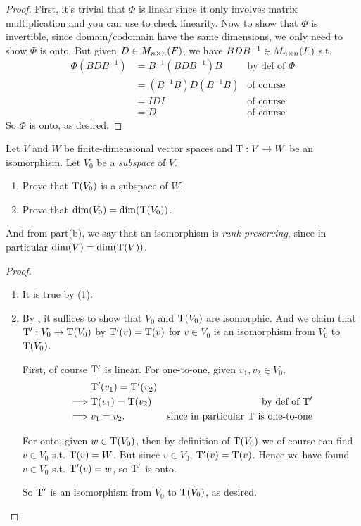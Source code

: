 \begin{proof}
First, it's trivial that \(\Phi\) is linear since it only involves matrix multiplication and you can use  to check linearity.
Now to show that \(\Phi\) is invertible, since domain/codomain have the same dimensions, we only need to show \(\Phi\) is onto.
But given \(D \in M_{n \times n}(F)\), we have \(B D B^{-1} \in M_{n \times n}(F)\) s.t.
\begin{align*}
    \Phi(B D B^{-1}) & = B^{-1} (B D B^{-1}) B & \text{by def of \(\Phi\)} \\
                     & = (B^{-1}B) D (B^{-1} B) & \text{of course} \\
                     & = IDI & \text{of course} \\
                     & = D & \text{of course}
\end{align*}
So \(\Phi\) is onto, as desired.
\end{proof}

\begin{exercise} \label{exercise 2.4.17}
Let \(V\) and \(W\) be finite-dimensional vector spaces and \(\mathrm{T} : V \to W\) be an isomorphism.
Let \(V_0\) be a \emph{subspace} of \(V\).
\begin{enumerate}
\item Prove that \(\mathrm{T}(V_0)\) is a subspace of \(W\).
\item Prove that \(\dim(V_0) = \dim(\mathrm{T}(V_0))\).
\end{enumerate}
And from part(b), we say that an isomorphism is \emph{rank-preserving}, since in particular \(\dim(V) = \dim(\mathrm{T}(V))\).
\end{exercise}

\begin{proof} \ 

\begin{enumerate}
\item It is true by (1).
\item By , it suffices to show that \(V_0\) and \(\mathrm{T}(V_0)\) are isomorphic.
And we claim that \(\mathrm{T}' : V_0 \to \mathrm{T}(V_0)\) by \(\mathrm{T}'(v) = \mathrm{T}(v)\) for \(v \in V_0\) is an isomorphism from \(V_0\) to \(\mathrm{T}(V_0)\).

First, of course \(\mathrm{T}'\) is linear.
For one-to-one, given \(v_1, v_2 \in V_0\),
\begin{align*}
             & \mathrm{T}'(v_1) = \mathrm{T}'(v_2) \\
    \implies & \mathrm{T}(v_1) = \mathrm{T}(v_2) & \text{by def of \(\mathrm{T}'\)} \\
    \implies & v_1 = v_2. & \text{since in particular \(\mathrm{T}\) is one-to-one}
\end{align*}

For onto, given \(w \in \mathrm{T}(V_0)\), then by definition of \(\mathrm{T}(V_0)\) we of course can find \(v \in V_0\) s.t. \(\mathrm{T}(v) = W\).
But since \(v \in V_0\), \(\mathrm{T}'(v) = \mathrm{T}(v)\).
Hence we have found \(v \in V_0\) s.t. \(\mathrm{T}'(v) = w\), so \(\mathrm{T}'\) is onto.

So \(\mathrm{T}'\) is an isomorphism from \(V_0\) to \(\mathrm{T}(V_0)\), as desired.
\end{enumerate}

\end{proof}

